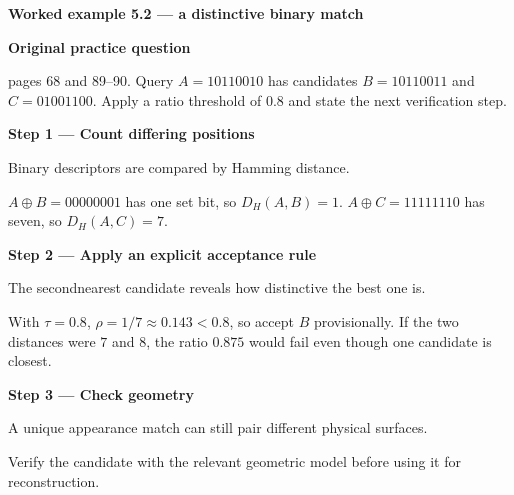 \documentclass[letterpaper,11pt,english,openany,oneside]{jupyterBook}
\begin{document}
\begin{TextbookBox}
\textbf{Worked example 5.2 — a distinctive binary match}\par\smallskip

\par\medskip\textbf{Original practice question}\par\smallskip

\sphinxAtStartPar
{} pages 68 and 89–90. Query \(A=10110010\) has candidates \(B=10110011\) and \(C=01001100\). Apply a ratio threshold of 0.8 and state the next verification step.

\par\medskip

\par\medskip{}
{\color{QuizStepRed}\bfseries Step 1 — Count differing positions}\par\smallskip

\sphinxAtStartPar
{} Binary descriptors are compared by Hamming distance.

\sphinxAtStartPar
{\color{QuizMathBlue} \(A\oplus B=00000001\)} has one set bit, so {\color{QuizMathBlue} \(D_H(A,B)=1\)}. {\color{QuizMathBlue} \(A\oplus C=11111110\)} has seven, so {\color{QuizMathBlue} \(D_H(A,C)=7\)}.

\par

\par\medskip{}
{\color{QuizStepRed}\bfseries Step 2 — Apply an explicit acceptance rule}\par\smallskip

\sphinxAtStartPar
{} The second\sphinxhyphen{}nearest candidate reveals how distinctive the best one is.

\sphinxAtStartPar
With {\color{QuizMathBlue} \(\tau=0.8\)}, {\color{QuizMathBlue} \(\rho=1/7\approx0.143<0.8\)}, so accept {\color{QuizMathBlue} \(B\)} provisionally. If the two distances were {\color{QuizMathBlue} \(7\)} and {\color{QuizMathBlue} \(8\)}, the ratio {\color{QuizMathBlue} \(0.875\)} would fail even though one candidate is closest.

\par

\par\medskip{}
{\color{QuizStepRed}\bfseries Step 3 — Check geometry}\par\smallskip

\sphinxAtStartPar
{} A unique appearance match can still pair different physical surfaces.

\sphinxAtStartPar
Verify the candidate with the relevant geometric model before using it for reconstruction.

\par

\end{TextbookBox}
\end{document}
